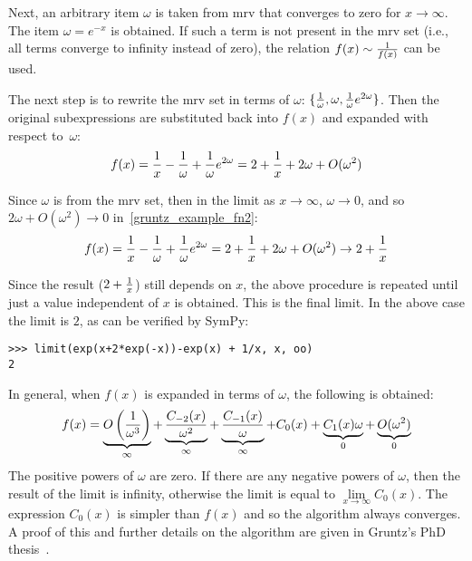 Next, an arbitrary item $\omega$ is taken from mrv that converges to zero for
$x\to\infty$. The item $\omega=e^{-x}$ is obtained. If such a term is not
present in the mrv set (i.e., all terms converge to infinity instead of zero),
the relation $f(x)\sim {1\over f(x)}$ can be used.

The next step is to rewrite the mrv set in terms of $\omega$: $\{{1\over\omega},
\omega, {1\over\omega}e^{2\omega}\}$. Then the original subexpressions are
substituted back into $f(x)$ and expanded with respect to~$\omega$:
\begin{equation}
    \label{gruntz_example_fn2}
f(x) = {1\over x}-{1\over\omega}+{1\over\omega}e^{2\omega}
     = 2+{1\over x} + 2\omega + O(\omega^2)
\end{equation}

Since $\omega$ is from the mrv set, then in the limit as $x\to\infty$,
$\omega\to0$, and so $2\omega + O(\omega^2) \to 0$ in~\eqref{gruntz_example_fn2}:
\begin{equation}
f(x) = {1\over x}-{1\over\omega}+{1\over\omega}e^{2\omega}
    = 2+{1\over x} + 2\omega + O(\omega^2)
    \to 2 + {1\over x}
\end{equation}

Since the result ($2+{1\over x}$) still depends on $x$, the above procedure is
repeated until just a value independent of $x$ is obtained. This is the final
limit. In the above case the limit is $2$, as can be
verified by SymPy:

\begin{verbatim}
>>> limit(exp(x+2*exp(-x))-exp(x) + 1/x, x, oo)
2
\end{verbatim}

In general, when $f(x)$ is expanded in terms of $\omega$, the following is obtained:
\begin{equation}
f(x) = \underbrace{O\left({1\over \omega^3}\right)}_\infty
    + \underbrace{C_{-2}(x)\over \omega^2}_\infty
    + \underbrace{C_{-1}(x)\over \omega}_\infty
    + {C_{0}(x)}
    + \underbrace{C_{1}(x)\omega}_0
    + \underbrace{O(\omega^2)}_0
\end{equation}
The positive powers of $\omega$ are zero. If there are any negative powers of
$\omega$, then the result of the limit is infinity, otherwise the limit is
equal to $\lim\limits_{x\to\infty} C_0(x)$. The expression $C_0(x)$ is simpler
than $f(x)$ and so the algorithm always converges. A proof of this and further
details on the algorithm are given in Gruntz's PhD thesis~\cite{Gruntz1996limits}.
